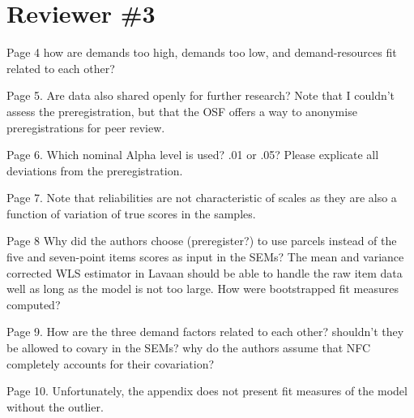 \documentclass[draft]{article}
\newcommand{\Assignment}[1]{
%
\ifoptiondraft{%
\vspace{.25\baselineskip} \parbox{1.0\linewidth}{\hfill \hfill \vspace{.25\baselineskip} \normalfont{Assignment:} \normalfont{\textbf{#1}}}%
}{}%
}
\begin{document}
\Assignment{JZ}

\hypertarget{reviewer-3}{%
\section{Reviewer \#3}\label{reviewer-3}}




Page 4
how are demands too high, demands too low, and demand-resources fit related to each other?

Page 5.
Are data also shared openly for further research?
Note that I couldn't assess the preregistration, but that the OSF offers a way to anonymise preregistrations for peer review.

Page 6.
Which nominal Alpha level is used? .01 or .05? Please explicate all deviations from the preregistration.

Page 7.
Note that reliabilities are not characteristic of scales as they are also a function of variation of true scores in the samples.

Page 8
Why did the authors choose (preregister?) to use parcels instead of the five and seven-point items scores as input in the SEMs? The mean and variance corrected WLS estimator in Lavaan should be able to handle the raw item data well as long as the model is not too large.
How were bootstrapped fit measures computed?

Page 9.
How are the three demand factors related to each other? shouldn't they be allowed to covary in the SEMs? why do the authors assume that NFC completely accounts for their covariation?

Page 10.
Unfortunately, the appendix does not present fit measures of the model without the outlier.
\end{document}
